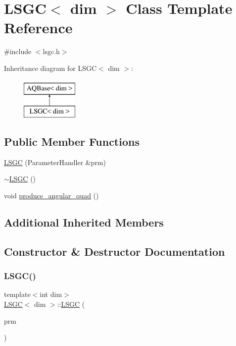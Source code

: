 \hypertarget{class_l_s_g_c}{}\section{L\+S\+GC$<$ dim $>$ Class Template Reference}
\label{class_l_s_g_c}


{\ttfamily \#include $<$lsgc.\+h$>$}

Inheritance diagram for L\+S\+GC$<$ dim $>$\+:\begin{figure}[H]
\begin{center}
\leavevmode
\includegraphics[height=2.000000cm]{class_l_s_g_c}
\end{center}
\end{figure}
\subsection*{Public Member Functions}
\begin{DoxyCompactItemize}
\item 
\hyperlink{class_l_s_g_c_a9b89f615563bd3583a4a6a36d7b3eb7d}{L\+S\+GC} (Parameter\+Handler \&prm)
\item 
\hyperlink{class_l_s_g_c_abcba8afdb075485278288db321776b7e}{$\sim$\+L\+S\+GC} ()
\item 
void \hyperlink{class_l_s_g_c_a1d135fb9ca12a9b65b8cc397479fc4d7}{produce\+\_\+angular\+\_\+quad} ()
\end{DoxyCompactItemize}
\subsection*{Additional Inherited Members}


\subsection{Constructor \& Destructor Documentation}
\mbox{\label{class_l_s_g_c_a9b89f615563bd3583a4a6a36d7b3eb7d}} 
\subsubsection{\texorpdfstring{L\+S\+G\+C()}{LSGC()}}
{\footnotesize\ttfamily template$<$int dim$>$ \\
\hyperlink{class_l_s_g_c}{L\+S\+GC}$<$ dim $>$\+::\hyperlink{class_l_s_g_c}{L\+S\+GC} (\begin{DoxyParamCaption}\item[{Parameter\+Handler \&}]{prm }\end{DoxyParamCaption})}

